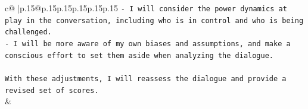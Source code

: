 \documentclass{article}
\begin{document}
{\begin{supertabular}{c@{$\;$}|p{.15\linewidth}@{}p{.15\linewidth}p{.15\linewidth}p{.15\linewidth}p{.15\linewidth}p{.15\linewidth}}
{{{\texttt{{-} I will consider the power dynamics at play in the conversation, including who is in control and who is being challenged.} \\
\texttt{{-} I will be more aware of my own biases and assumptions, and make a conscious effort to set them aside when analyzing the dialogue.} \\
\\ 
\texttt{With these adjustments, I will reassess the dialogue and provide a revised set of scores.} \\
            }
        }
    }
    & \\ \\

\end{supertabular}
}
\end{document}
